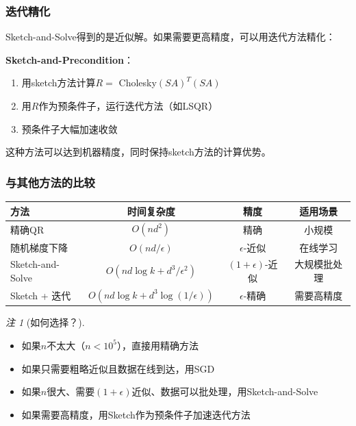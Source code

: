 \documentclass[11pt,a4paper]{ctexart}
\theoremstyle{definition}
\theoremstyle{remark}
\newtheorem{remark}[theorem]{注}
\begin{document}
\subsubsection{迭代精化}

Sketch-and-Solve得到的是近似解。如果需要更高精度，可以用迭代方法精化：

\textbf{Sketch-and-Precondition}：
\begin{enumerate}
    \item 用sketch方法计算$R = $ Cholesky$(SA)^T(SA)$
    \item 用$R$作为预条件子，运行迭代方法（如LSQR）
    \item 预条件子大幅加速收敛
\end{enumerate}

这种方法可以达到机器精度，同时保持sketch方法的计算优势。

\subsubsection{与其他方法的比较}

\begin{center}
\begin{tabular}{lccc}
\toprule
方法 & 时间复杂度 & 精度 & 适用场景 \\
\midrule
精确QR & $O(nd^2)$ & 精确 & 小规模 \\
随机梯度下降 & $O(nd/\epsilon)$ & $\epsilon$-近似 & 在线学习 \\
Sketch-and-Solve & $O(nd\log k + d^3/\epsilon^2)$ & $(1+\epsilon)$-近似 & 大规模批处理 \\
Sketch + 迭代 & $O(nd\log k + d^3\log(1/\epsilon))$ & $\epsilon$-精确 & 需要高精度 \\
\bottomrule
\end{tabular}
\end{center}

\begin{remark}[如何选择？]
\begin{itemize}
    \item 如果$n$不太大（$n < 10^5$），直接用精确方法
    \item 如果只需要粗略近似且数据在线到达，用SGD
    \item 如果$n$很大、需要$(1+\epsilon)$近似、数据可以批处理，用Sketch-and-Solve
    \item 如果需要高精度，用Sketch作为预条件子加速迭代方法
\end{itemize}
\end{remark}
\end{document}
